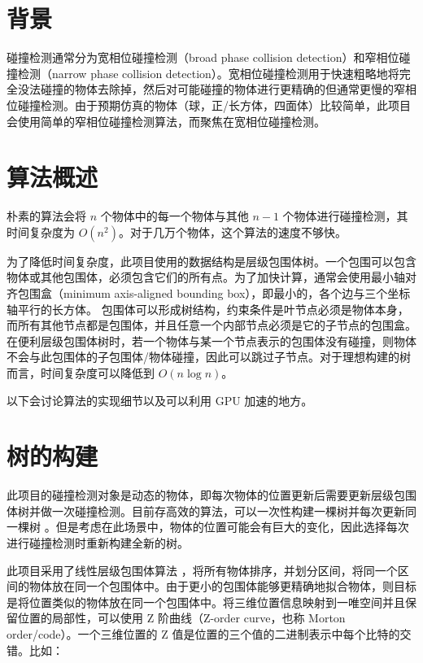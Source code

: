 \section{背景}

碰撞检测通常分为宽相位碰撞检测（broad phase collision detection）和窄相位碰撞检测（narrow phase collision detection）\cite{nvidiaCollisionDetection}。宽相位碰撞检测用于快速粗略地将完全没法碰撞的物体去除掉，然后对可能碰撞的物体进行更精确的但通常更慢的窄相位碰撞检测。由于预期仿真的物体（球，正/长方体，四面体）比较简单，此项目会使用简单的窄相位碰撞检测算法，而聚焦在宽相位碰撞检测。

\section{算法概述}

朴素的算法会将 $n$ 个物体中的每一个物体与其他 $n-1$ 个物体进行碰撞检测，其时间复杂度为 $O(n^2)$。对于几万个物体，这个算法的速度不够快。

为了降低时间复杂度，此项目使用的数据结构是层级包围体树。一个包围可以包含物体或其他包围体，必须包含它们的所有点。为了加快计算，通常会使用最小轴对齐包围盒（minimum axis-aligned bounding box），即最小的，各个边与三个坐标轴平行的长方体。
包围体可以形成树结构，约束条件是叶节点必须是物体本身，而所有其他节点都是包围体，并且任意一个内部节点必须是它的子节点的包围盒。
在便利层级包围体树时，若一个物体与某一个节点表示的包围体没有碰撞，则物体不会与此包围体的子包围体/物体碰撞，因此可以跳过子节点。对于理想构建的树而言，时间复杂度可以降低到 $O(n\log n)$。

以下会讨论算法的实现细节以及可以利用 GPU 加速的地方。

\section{树的构建}

此项目的碰撞检测对象是动态的物体，即每次物体的位置更新后需要更新层级包围体树并做一次碰撞检测。目前存高效的算法，可以一次性构建一棵树并每次更新同一棵树 \cite{Wald2008}。但是考虑在此场景中，物体的位置可能会有巨大的变化，因此选择每次进行碰撞检测时重新构建全新的树。

此项目采用了线性层级包围体算法 \cite{Lauterbach2009}，将所有物体排序，并划分区间，将同一个区间的物体放在同一个包围体中。由于更小的包围体能够更精确地拟合物体，则目标是将位置类似的物体放在同一个包围体中。将三维位置信息映射到一唯空间并且保留位置的局部性，可以使用 Z 阶曲线（Z-order curve，也称 Morton order/code）\cite{wikipediaZorderCurve}。一个三维位置的 Z 值是位置的三个值的二进制表示中每个比特的交错。比如：


